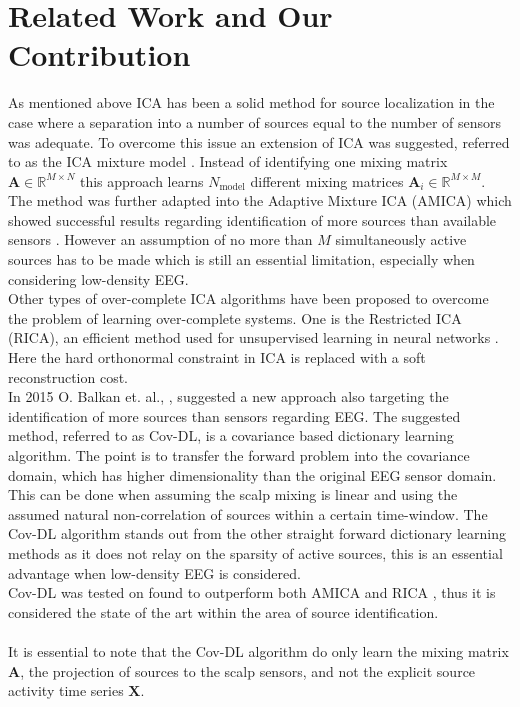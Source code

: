 \section{Related Work and Our Contribution} 
As mentioned above ICA has been a solid method for source localization in the case where a separation into a number of sources equal to the number of sensors was adequate. 
To overcome this issue an extension of ICA was suggested, referred to as the ICA mixture model \cite{Balkan2015}.
Instead of identifying one mixing matrix $\mathbf{A} \in \mathbb{R}^{M \times N}$ this approach learns $N_{\text{model}}$ different mixing matrices $\mathbf{A}_i \in \mathbb{R}^{M\times M}$. 
The method was further adapted into the Adaptive Mixture ICA (AMICA) which showed successful results regarding identification of more sources than available sensors \cite{Palmer2008}. 
However an assumption of no more than $M$ simultaneously active sources has to be made which is still an essential limitation, especially when considering low-density EEG. 
\\
Other types of over-complete ICA algorithms have been proposed to overcome the problem of learning over-complete systems. 
One is the Restricted ICA (RICA), an efficient method used for unsupervised learning in neural networks \cite{Le2011}. 
Here the hard orthonormal constraint in ICA is replaced with a soft reconstruction cost.
\\
In 2015 O. Balkan et. al., \cite{Balkan2015}, suggested a new approach also targeting the identification of more sources than sensors regarding EEG. 
The suggested method, referred to as Cov-DL, is a covariance based dictionary learning algorithm. 
The point is to transfer the forward problem into the covariance domain, which has higher dimensionality than the original EEG sensor domain. 
This can be done when assuming the scalp mixing is linear and using the assumed natural non-correlation of sources within a certain time-window. 
The Cov-DL algorithm stands out from the other straight forward dictionary learning methods as it does not relay on the sparsity of active sources, this is an essential advantage when low-density EEG is considered. 
\\
Cov-DL was tested on found to outperform both AMICA and RICA \cite{Balkan2015}, thus it is considered the state of the art within the area of source identification. 
\\ \\
It is essential to note that the Cov-DL algorithm do only learn the mixing matrix $\mathbf{A}$, the projection of sources to the scalp sensors, and not the explicit source activity time series $\mathbf{X}$.
